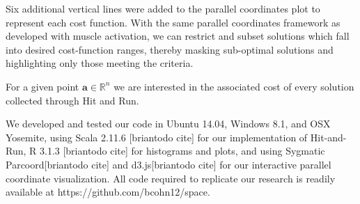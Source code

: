  Six additional vertical lines were added to the parallel coordinates plot to represent each cost function. With the same parallel coordinates framework as developed with muscle activation, we can restrict and subset solutions which fall into desired cost-function ranges, thereby masking sub-optimal solutions and highlighting only those meeting the criteria.

For a given point $\textbf{a} \in \mathbb{R}^n$ we are interested in the associated cost of every solution collected through Hit and Run.

We developed and tested our code in  Ubuntu 14.04, Windows 8.1, and OSX Yosemite, using Scala 2.11.6 [briantodo cite] for our implementation of Hit-and-Run, R 3.1.3 [briantodo cite] for histograms and plots, and using Sygmatic Parcoord[briantodo cite] and d3.js[briantodo cite] for our interactive parallel coordinate visualization. All code required to replicate our research is readily available at https://github.com/bcohn12/space.